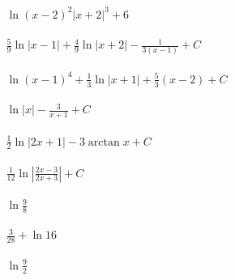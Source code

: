 \documentclass[11pt]{amsbook}
\begin{document}
\begin{hEnumerateArabic}
\item
\begin{hEnumerateAlpha}
\item $\begin{aligned}\ln{(x-2)^{2}}|x+2|^{3} + 6\end{aligned}$
\item $\begin{aligned}\frac{5}{9}\ln{|x-1|} + \frac{4}{9}\ln{|x+2|} - \frac{1}{3(x-1)} + C\end{aligned}$
\item $\begin{aligned}\ln{(x-1)^{4}} + \frac{1}{3}\ln{|x+1|} + \frac{5}{3}(x-2) + C\end{aligned}$
\item $\begin{aligned}\ln{|x|} - \frac{3}{x+1} + C\end{aligned}$
\end{hEnumerateAlpha}

\item
\begin{hEnumerateAlpha}
\item $\begin{aligned}\frac{1}{2}\ln|2x+1| - 3\arctan{x} + C\end{aligned}$
\item $\begin{aligned}\frac{1}{12}\ln{\left|\frac{2x-3}{2x+3}\right|} + C\end{aligned}$
\end{hEnumerateAlpha}

\item
\begin{hEnumerateAlpha}
\item $\begin{aligned}\ln\frac{9}{8}\end{aligned}$
\item $\begin{aligned}\frac{3}{28} + \ln{16}\end{aligned}$
\end{hEnumerateAlpha}

\item $\begin{aligned}\ln\frac{9}{2}\end{aligned}$

\end{hEnumerateArabic}
\end{document}
